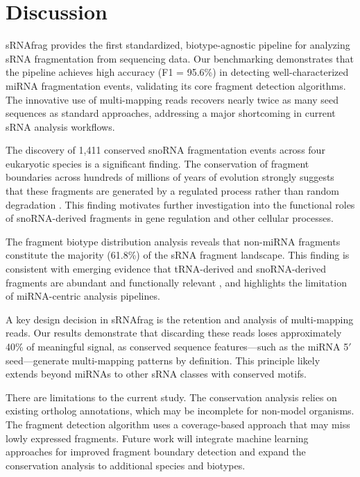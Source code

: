\documentclass[11pt]{article}
\begin{document}
\section{Discussion}

sRNAfrag provides the first standardized, biotype-agnostic pipeline for analyzing sRNA fragmentation from sequencing data. Our benchmarking demonstrates that the pipeline achieves high accuracy (F1 = 95.6\%) in detecting well-characterized miRNA fragmentation events, validating its core fragment detection algorithms. The innovative use of multi-mapping reads recovers nearly twice as many seed sequences as standard approaches, addressing a major shortcoming in current sRNA analysis workflows.

The discovery of 1,411 conserved snoRNA fragmentation events across four eukaryotic species is a significant finding. The conservation of fragment boundaries across hundreds of millions of years of evolution strongly suggests that these fragments are generated by a regulated process rather than random degradation \citep{taft2009,ender2008}. This finding motivates further investigation into the functional roles of snoRNA-derived fragments in gene regulation and other cellular processes.

The fragment biotype distribution analysis reveals that non-miRNA fragments constitute the majority (61.8\%) of the sRNA fragment landscape. This finding is consistent with emerging evidence that tRNA-derived and snoRNA-derived fragments are abundant and functionally relevant \citep{kumar2016,li2012}, and highlights the limitation of miRNA-centric analysis pipelines.

A key design decision in sRNAfrag is the retention and analysis of multi-mapping reads. Our results demonstrate that discarding these reads loses approximately 40\% of meaningful signal, as conserved sequence features---such as the miRNA 5$'$ seed---generate multi-mapping patterns by definition. This principle likely extends beyond miRNAs to other sRNA classes with conserved motifs.

There are limitations to the current study. The conservation analysis relies on existing ortholog annotations, which may be incomplete for non-model organisms. The fragment detection algorithm uses a coverage-based approach that may miss lowly expressed fragments. Future work will integrate machine learning approaches for improved fragment boundary detection \citep{axtell2014} and expand the conservation analysis to additional species and biotypes.
\end{document}
